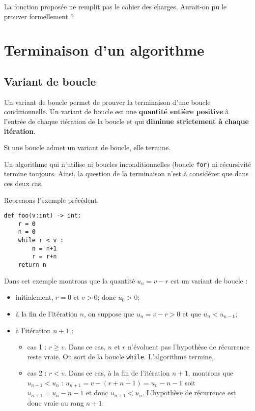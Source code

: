 \bigskip

\begin{resultat}
La fonction proposée ne remplit pas le cahier des charges. Aurait-on pu le prouver formellement ?
\end{resultat}

\section{Terminaison d'un algorithme}

\subsection{Variant de boucle}
\begin{defi}
Un variant de boucle permet de prouver la terminaison d'une boucle conditionnelle.  Un variant de boucle est une \textbf{quantité entière positive} à l’entrée de chaque
itération de la boucle et qui \textbf{diminue strictement à chaque itération}.
\end{defi}

\begin{theoreme}
Si une boucle admet un variant de boucle, elle termine.
\end{theoreme}

\begin{prop}
Un algorithme qui n’utilise ni boucles inconditionnelles (boucle \texttt{for}) ni récursivité termine toujours. Ainsi,
la question de la terminaison n’est à considérer que dans ces deux cas.
\end{prop}

Reprenons l'exemple précédent. 
\begin{lstlisting}
def foo(v:int) -> int:
    r = 0
    n = 0
    while r < v : 
        n = n+1
        r = r+n
    return n
\end{lstlisting}

Dans cet exemple montrons que la quantité $u_n = v-r$ est un variant de boucle : 
\begin{itemize}
\item initialement, $r=0$ et $v>0$; donc  $u_0 > 0$;
\item à la fin de l'itération $n$, on suppose que $u_n = v-r >0$ et que $u_n < u_{n-1}$;
\item à l'itération $n+1$ : 
\begin{itemize}
\item cas 1 : $r\geq v$. Dans ce cas, $n$ et $r$ n'évoluent pas l'hypothèse de récurrence reste vraie. On sort de la boucle \texttt{while}. L'algorithme termine,
\item cas 2 : $r < v$. Dans ce cas, à la fin de l'itération $n+1$,  montrons que  $u_{n+1} < u_{n}$ : $u_{n+1} = v - (r + n + 1) =  u_n -n - 1$ soit $u_{n+1} =u_n -n - 1$ et donc $u_{n+1} < u_{n}$. L'hypothèse de récurrence est donc vraie au rang $n+1$. 
\end{itemize}
\end{itemize}

